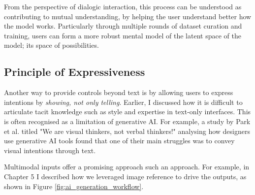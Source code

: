 From the perspective of dialogic interaction, this process can be understood as contributing to mutual understanding, by helping the user understand better how the model works. Particularly through multiple rounds of dataset curation and training, users can form a more robust mental model of the latent space of the model; its space of possibilities.

\subsection{Principle of Expressiveness}

Another way to provide controls beyond text is by allowing users to express intentions by \textit{showing, not only telling}. Earlier, I discussed how it is difficult to articulate tacit knowledge such as style and expertise in text-only interfaces. This is often recognised as a limitation of generative AI. For example, a study by Park et al. \cite{Park2024-gw} titled "We are visual thinkers, not verbal thinkers!" analysing how designers use generative AI tools found that one of their main struggles was to convey visual intentions through text.

Multimodal inputs offer a promising approach such an approach. For example, in Chapter 5 I described how we leveraged image reference to drive the outputs, as shown in Figure  \ref{fig:ai_generation_workflow}.


